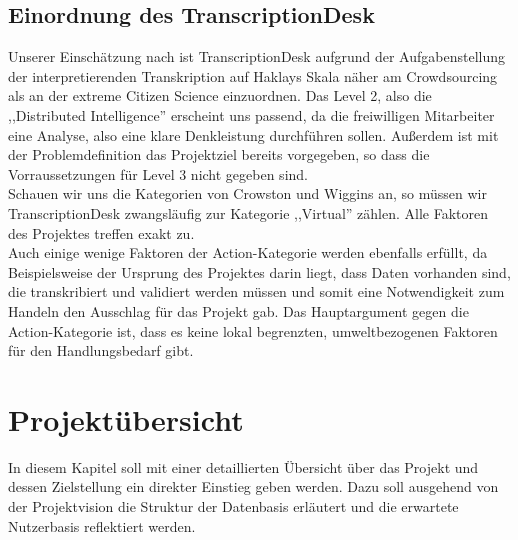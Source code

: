 \documentclass{article}
\begin{document}
\subsection{Einordnung des TranscriptionDesk}
Unserer Einschätzung nach ist TranscriptionDesk aufgrund der Aufgabenstellung der interpretierenden Transkription auf Haklays Skala näher am
Crowdsourcing als an der extreme Citizen Science einzuordnen.
Das Level 2, also die ,,Distributed Intelligence'' erscheint uns passend, da die freiwilligen Mitarbeiter eine Analyse, also eine klare Denkleistung durchführen sollen.
Außerdem ist mit der Problemdefinition das Projektziel bereits vorgegeben, so dass die Vorraussetzungen für Level 3 nicht gegeben sind.\\
Schauen wir uns die Kategorien von Crowston und Wiggins an, so müssen wir TranscriptionDesk zwangsläufig zur Kategorie ,,Virtual'' zählen.
Alle Faktoren des Projektes treffen exakt zu.\\
Auch einige wenige Faktoren der Action-Kategorie werden ebenfalls erfüllt, da Beispielsweise der Ursprung des Projektes darin liegt,
dass Daten vorhanden sind, die transkribiert und validiert werden müssen und somit eine Notwendigkeit zum Handeln den Ausschlag für das Projekt gab.
Das Hauptargument gegen die Action-Kategorie ist, dass es keine lokal begrenzten, umweltbezogenen Faktoren für den Handlungsbedarf gibt.

\section{Projektübersicht}
In diesem Kapitel soll mit einer detaillierten Übersicht über das Projekt und dessen Zielstellung ein direkter Einstieg geben werden.
Dazu soll ausgehend von der Projektvision die Struktur der Datenbasis erläutert und die erwartete Nutzerbasis reflektiert werden.
\end{document}
